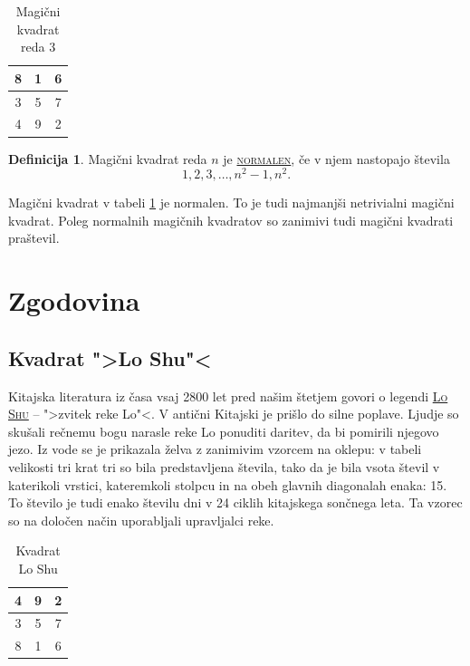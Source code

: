 \documentclass[a4paper,12pt]{article}
\newcommand{\pojem}[1]{\underline{\textsc{#1}}}
\theoremstyle{definition}
\newtheorem{definicija}{Definicija}
\theoremstyle{plain}
\newenvironment{magic}[3]{
   \begin{table}[!ht]%
   \centering%
   \caption{#2}%
   \label{#3}%
   \large
   \begin{tabular}{|*{#1}{c|}}%
      \hline
}{
   \end{tabular}%
   \end{table}%
}
\begin{document}
\begin{magic}{3}{Magični kvadrat reda 3}{tab:Red3}
   8 & 1 & 6 \\\hline
   3 & 5 & 7 \\\hline
   4 & 9 & 2 \\\hline
\end{magic}

\begin{definicija}
   Magični kvadrat reda $n$ je \pojem{normalen}, če v njem nastopajo števila
   \begin{equation}
      \label{eq:normalen}
      1, 2, 3, \dots, n^2 - 1, n^2.
   \end{equation}
\end{definicija}

Magični kvadrat v tabeli \ref{tab:Red3} je normalen.
To je tudi najmanjši netrivialni magični kvadrat.
Poleg normalnih magičnih kvadratov so zanimivi tudi magični kvadrati praštevil.


\section{Zgodovina}

\subsection{Kvadrat ">Lo Shu"<}

Kitajska literatura iz časa vsaj 2800 let pred našim štetjem govori o legendi
\pojem{Lo Shu} -- ">zvitek reke Lo"<. V antični Kitajski je prišlo do
silne poplave. Ljudje so skušali rečnemu bogu narasle reke Lo ponuditi daritev,
da bi pomirili njegovo jezo. Iz vode se je prikazala želva z zanimivim vzorcem
na oklepu: v tabeli velikosti tri krat tri so bila predstavljena števila, tako
da je bila vsota števil v katerikoli vrstici, kateremkoli stolpcu in na obeh
glavnih diagonalah enaka: 15. To število je tudi enako številu dni v 24 ciklih
kitajskega sončnega leta. Ta vzorec so na določen način uporabljali upravljalci
reke.

\begin{magic}{3}{Kvadrat Lo Shu}{tab:LoShu}
   4 & 9 & 2 \\\hline
   3 & 5 & 7 \\\hline
   8 & 1 & 6 \\\hline
\end{magic}
\end{document}
